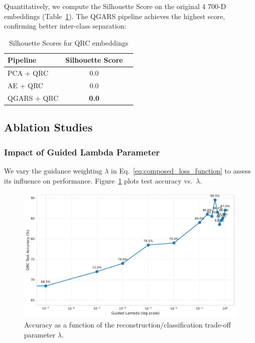 \documentclass[conference]{IEEEtran}
\begin{document}
Quantitatively, we compute the Silhouette Score on the original 4 700-D embeddings (Table~\ref{tab:silhouette}). The QGARS pipeline achieves the highest score, confirming better inter-class separation:

\begin{table}[ht]
  \caption{Silhouette Scores for QRC embeddings}
  \label{tab:silhouette}
  \centering
  \begin{tabular}{lcc}
    \hline
    Pipeline         & Silhouette Score \\
    \hline
    PCA + QRC        & 0.0 \\
    AE + QRC         & 0.0 \\
    QGARS + QRC      & \textbf{0.0} \\
    \hline
  \end{tabular}
\end{table}


\subsection{Ablation Studies}

\subsubsection{Impact of Guided Lambda Parameter}
We vary the guidance weighting $\lambda$ in Eq.~\ref{eq:composed_loss_function} to assess its influence on performance. Figure~\ref{fig:lambda_sweep} plots test accuracy vs.\ $\lambda$.

\begin{figure}[ht]
  \centering
  \includegraphics[width=1\linewidth]{paper/images/results/generated_polyp_dataset/guided_lambda_log_effect.pdf}
  \caption{Accuracy as a function of the reconstruction/classification trade-off parameter $\lambda$.}
  \label{fig:lambda_sweep}
\end{figure}
\end{document}
